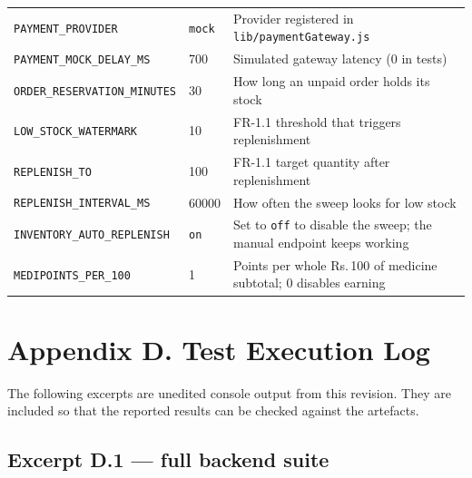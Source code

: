 \documentclass[11pt,a4paper]{article}
\providecommand{\rupee}{Rs.\,}
\begin{document}
{\begin{longtable}{@{}L{4.60cm}L{3.40cm}L{7.44cm}@{}}
\texttt{PAYMENT\_PROVIDER} & \texttt{mock} & Provider registered in \texttt{lib/paymentGateway.js}\\
\texttt{PAYMENT\_MOCK\_DELAY\_MS} & 700 & Simulated gateway latency (0 in tests)\\
\texttt{ORDER\_RESERVATION\_MINUTES} & 30 & How long an unpaid order holds its stock\\
\texttt{LOW\_STOCK\_WATERMARK} & 10 & FR-1.1 threshold that triggers replenishment\\
\texttt{REPLENISH\_TO} & 100 & FR-1.1 target quantity after replenishment\\
\texttt{REPLENISH\_INTERVAL\_MS} & 60000 & How often the sweep looks for low stock\\
\texttt{INVENTORY\_AUTO\_REPLENISH} & \texttt{on} & Set to \texttt{off} to disable the sweep; the manual endpoint keeps working\\
\texttt{MEDIPOINTS\_PER\_100} & 1 & Points per whole \rupee100 of medicine subtotal; 0 disables earning\\
\end{longtable}
}

\clearpage
{}
\section*{Appendix D. Test Execution Log}

The following excerpts are unedited console output from this revision. They are included
so that the reported results can be checked against the artefacts.

\subsection*{Excerpt D.1 --- full backend suite}
\end{document}
